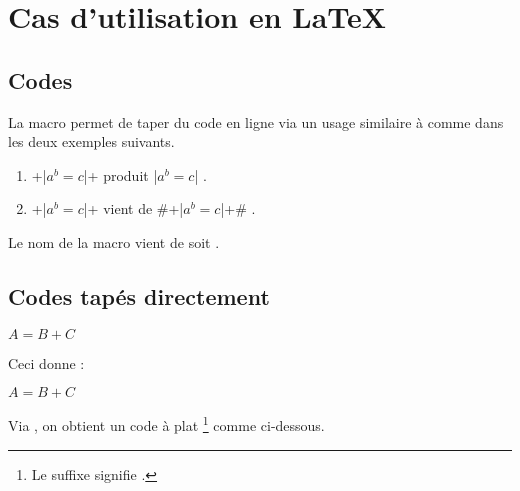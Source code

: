 \documentclass[12pt,a4paper]{article}
\begin{document}
\section{Cas d'utilisation en \LaTeX}

\subsection{Codes }

La macro  permet de taper du code en ligne via un usage similaire à  comme dans les deux exemples suivants.

\begin{enumerate}
	\item \docilatex+\docilatex|$a^b = c$|+ produit \docilatex|$a^b = c$| .

	\item \docilatex+\docilatex|$a^b = c$|+ vient de \docilatex#\docilatex+\docilatex|$a^b = c$|+# .
\end{enumerate}


\begin{docrem}
	Le nom de la macro  vient de  soit .
\end{docrem}




\subsection{Codes tapés directement}





\begin{doclatex-alone}
\begin{doclatex}
    $A = B + C$
\end{doclatex}
\end{doclatex-alone}

Ceci donne :

\begin{doclatex}
    $A = B + C$
\end{doclatex}




\docexa[À la suite]

Via , on obtient un code à plat
\footnote{
    Le suffixe  signifie .
}
comme ci-dessous.
\end{document}
